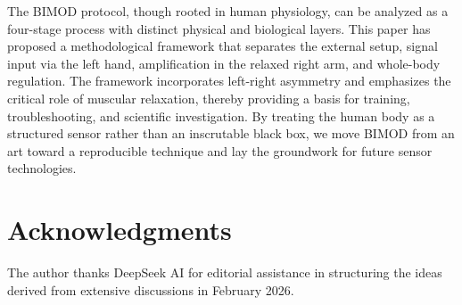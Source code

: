 \documentclass[12pt,a4paper]{article}
\begin{document}
The BIMOD protocol, though rooted in human physiology, can be analyzed as a four-stage process with distinct physical and biological layers. This paper has proposed a methodological framework that separates the external setup, signal input via the left hand, amplification in the relaxed right arm, and whole-body regulation. The framework incorporates left-right asymmetry and emphasizes the critical role of muscular relaxation, thereby providing a basis for training, troubleshooting, and scientific investigation. By treating the human body as a structured sensor rather than an inscrutable black box, we move BIMOD from an art toward a reproducible technique and lay the groundwork for future sensor technologies.

\section*{Acknowledgments}
The author thanks DeepSeek AI for editorial assistance in structuring the ideas derived from extensive discussions in February 2026.


\end{document}
